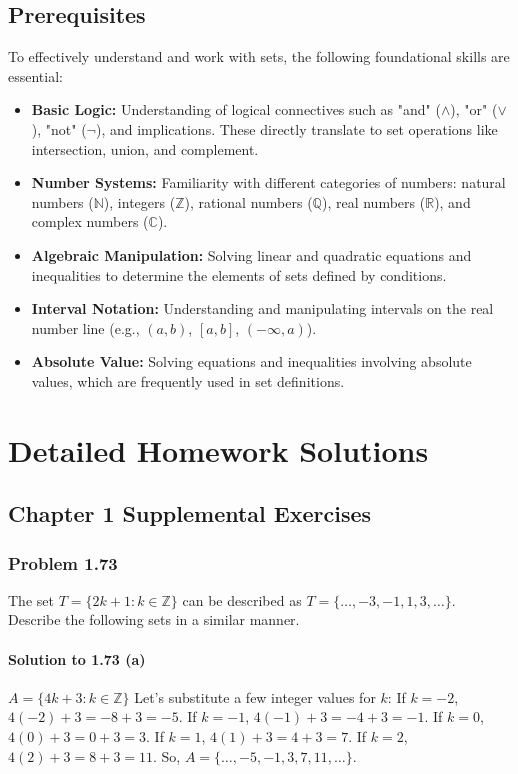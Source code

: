 \documentclass{article}
\begin{document}
\subsection{Prerequisites}
To effectively understand and work with sets, the following foundational skills are essential:
\begin{itemize}
    \item \textbf{Basic Logic:} Understanding of logical connectives such as "and" ($\land$), "or" ($\lor$), "not" ($\neg$), and implications. These directly translate to set operations like intersection, union, and complement.
    \item \textbf{Number Systems:} Familiarity with different categories of numbers: natural numbers ($\mathbb{N}$), integers ($\mathbb{Z}$), rational numbers ($\mathbb{Q}$), real numbers ($\mathbb{R}$), and complex numbers ($\mathbb{C}$).
    \item \textbf{Algebraic Manipulation:} Solving linear and quadratic equations and inequalities to determine the elements of sets defined by conditions.
    \item \textbf{Interval Notation:} Understanding and manipulating intervals on the real number line (e.g., $(a, b)$, $[a, b]$, $(-\infty, a)$).
    \item \textbf{Absolute Value:} Solving equations and inequalities involving absolute values, which are frequently used in set definitions.
\end{itemize}

\section{Detailed Homework Solutions}

\subsection*{Chapter 1 Supplemental Exercises}

\subsubsection*{Problem 1.73}
The set $T = \{2k + 1 : k \in \mathbb{Z}\}$ can be described as $T = \{\dots, -3, -1, 1, 3, \dots\}$. Describe the following sets in a similar manner.

\paragraph*{Solution to 1.73 (a)}
$A = \{4k + 3 : k \in \mathbb{Z}\}$
Let's substitute a few integer values for $k$:
If $k = -2$, $4(-2) + 3 = -8 + 3 = -5$.
If $k = -1$, $4(-1) + 3 = -4 + 3 = -1$.
If $k = 0$, $4(0) + 3 = 0 + 3 = 3$.
If $k = 1$, $4(1) + 3 = 4 + 3 = 7$.
If $k = 2$, $4(2) + 3 = 8 + 3 = 11$.
So, $A = \{\dots, -5, -1, 3, 7, 11, \dots\}$.
\end{document}

